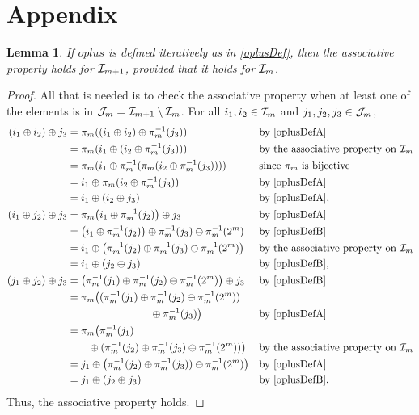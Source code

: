 \documentclass[12pt]{amsart}
\newtheorem{lemma}{Lemma}
\begin{document}
\section{Appendix}
\begin{lemma} \label{lem:assocProp}
If $oplus$ is defined iteratively as in \eqref{oplusDef}, then the associative property holds for $\mathcal{I}_{m+1}$, provided that it holds for $\mathcal{I}_m$.
\end{lemma}  
\begin{proof}
All that is needed is to check the associative property when at least one of the elements is in $\mathcal{J}_m = \mathcal{I}_{m+1} \setminus \mathcal{I}_m$.  For all $i_1, i_2 \in \mathcal{I}_m$ and $j_1, j_2, j_3 \in \mathcal{J}_m$, 
\begin{align*}
    (i_1 \oplus i_2) \oplus j_3 & = \pi_m((i_1 \oplus i_2) \oplus \pi_m^{-1}(j_3)) && \text{by } \eqref{oplusDefA} \\
    & = \pi_m(i_1 \oplus (i_2 \oplus \pi_m^{-1}(j_3))) && \text{by the associative property on } \mathcal{I}_m \\
    & = \pi_m(i_1 \oplus \pi_m^{-1}(\pi_m(i_2 \oplus \pi_m^{-1}(j_3)))) && \text{since $\pi_m$ is bijective}\\
    & = i_1 \oplus \pi_m(i_2 \oplus \pi_m^{-1}(j_3)) && \text{by } \eqref{oplusDefA} \\
    & = i_1 \oplus (i_2 \oplus j_3) && \text{by } \eqref{oplusDefA}, \\
    (i_1 \oplus j_2) \oplus j_3 & = \pi_m \bigl(i_1 \oplus \pi_m^{-1}(j_2) \bigr) \oplus j_3 && \text{by } \eqref{oplusDefA} \\
    & = \bigl (i_1 \oplus \pi_m^{-1}(j_2) \bigr) \oplus \pi_m^{-1}(j_3) \ominus \pi_m^{-1}(2^m) && \text{by } \eqref{oplusDefB} \\
    & = i_1 \oplus \bigl (\pi_m^{-1}(j_2) \oplus \pi_m^{-1}(j_3)\ominus \pi_m^{-1}(2^m) \bigr) && \text{by the associative property on } \mathcal{I}_m \\
    & = i_1 \oplus (j_2 \oplus j_3) && \text{by } \eqref{oplusDefB}, \\
    (j_1 \oplus j_2) \oplus j_3 & = \bigl(\pi_m^{-1}(j_1) \oplus \pi_m^{-1}(j_2) \ominus \pi_m^{-1}(2^m) \bigr) \oplus j_3 && \text{by } \eqref{oplusDefB} \\
    & = \pi_m\bigl ((\pi_m^{-1}(j_1) \oplus \pi_m^{-1}(j_2)  \ominus \pi_m^{-1}(2^m)) \\
    &\qquad \qquad \qquad \qquad \oplus \pi_m^{-1}(j_3) \bigr) && \text{by } \eqref{oplusDefA} \\
    & = \pi_m\bigl (\pi_m^{-1}(j_1) \\
    & \qquad  \oplus (\pi_m^{-1}(j_2) \oplus \pi_m^{-1}(j_3)\ominus \pi_m^{-1}(2^m)) \bigr) && \text{by the associative property on } \mathcal{I}_m \\
    & = j_1 \oplus \bigl (\pi_m^{-1}(j_2) \oplus \pi_m^{-1}(j_3)) \ominus \pi_m^{-1}(2^m) \bigr) && \text{by } \eqref{oplusDefA} \\
    & = j_1 \oplus (j_2 \oplus j_3) && \text{by } \eqref{oplusDefB}.
\end{align*}
Thus, the associative property holds.
\end{proof}
\end{document}
